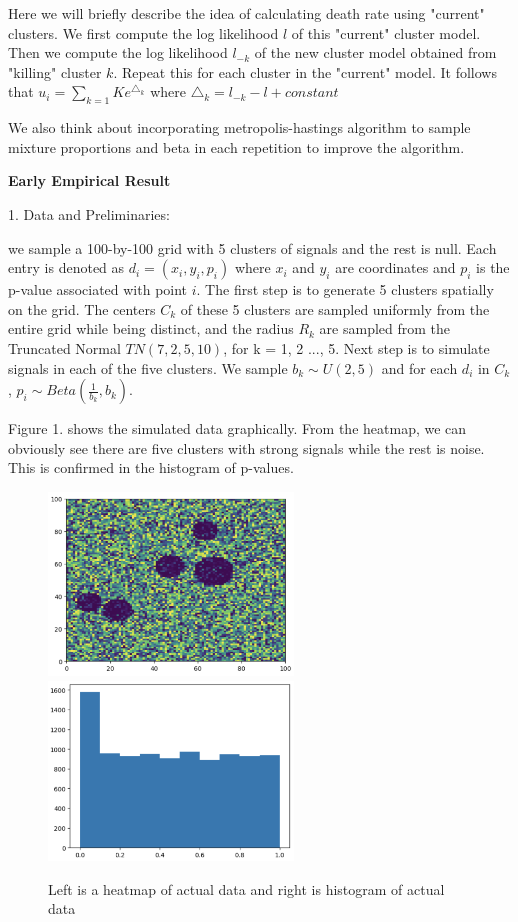 \documentclass[12pt]{article}
\begin{document}
Here we will briefly describe the idea of calculating death rate using "current" clusters. We first compute the log likelihood $l$ of this "current" cluster model. Then we compute the log likelihood $l_{-k}$ of the new cluster model obtained from "killing" cluster $k$. Repeat this for each cluster in the "current" model. It follows that $u_i = \sum_{k=1}{K} e^{\triangle_k}$ where $\triangle_k = l_{-k} - l + constant$ 

We also think about incorporating metropolis-hastings algorithm to sample mixture proportions and beta in each repetition to improve the algorithm.


\vspace{1em}
{\bf Early Empirical Result } 

1. Data and Preliminaries: 

we sample a 100-by-100 grid with 5 clusters of signals and the rest is null. Each entry is denoted as
$d_i = (x_i, y_i, p_i)$ where $x_i$ and $y_i$ are coordinates and $p_i$ is the p-value associated with point $i$. The first step is to generate 5 clusters spatially on the grid. The centers $C_k$ of these 5 clusters are sampled uniformly from the entire grid while being distinct, and the radius $R_k$ are sampled from the Truncated Normal $TN(7, 2, 5,10)$, for k = 1, 2 ..., 5. Next step is to simulate signals in each of the five clusters. We sample $b_k \sim U(2,5)$ and for each $d_i$ in $C_k$, $p_i \sim Beta(\frac{1}{b_k},b_k)$.

Figure 1. shows the simulated data graphically. From the heatmap, we can obviously see there are five clusters with strong signals while the rest is noise. This is confirmed in the histogram of p-values. 

\begin{figure}[h]
\caption{Left is a heatmap of actual data and right is histogram of actual data}
\centering
\includegraphics[width=6.5cm]{actualgrid}
\includegraphics[width=6.5cm]{actualhist}
\end{figure}
\end{document}

